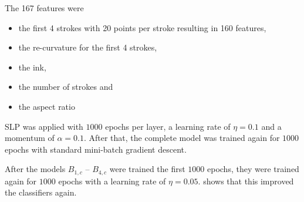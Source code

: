 \documentclass[9pt,technote]{IEEEtran}
\begin{document}
The 167 features were

\begin{itemize}
     \item the first 4 strokes with 20 points per stroke resulting in 160
           features,
     \item the re-curvature for the first 4 strokes,
     \item the ink,
     \item the number of strokes and
     \item the aspect ratio
\end{itemize}

\Gls{SLP} was applied with $\num{1000}$ epochs per layer, a
learning rate of $\eta=0.1$ and a momentum of $\alpha=0.1$. After that, the
complete model was trained again for $1000$ epochs with standard mini-batch
gradient descent.

After the models $B_{1,c}$ -- $B_{4,c}$ were trained the first $1000$ epochs,
they were trained again for $1000$ epochs with a learning rate of $\eta = 0.05$.
 shows that
this improved the classifiers again.
\end{document}
